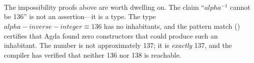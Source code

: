 \documentclass[11pt,a4paper]{book}
\def\alpha{alpha}%
\def\texttt#1{#1}%
\def\text#1{#1}%
\begin{document}
\begin{code}
\AgdaSpace{}%
\<%
\\
\>[0]\AgdaSpace{}%
\AgdaSymbol{=}\AgdaSpace{}%
\<%
\\
%
\\[\AgdaEmptyExtraSkip]%
\>[0]\AgdaSpace{}%
\AgdaSymbol{:}\AgdaSpace{}%
\AgdaSpace{}%
\AgdaSpace{}%
\<%
\\
\>[0]\AgdaSpace{}%
\AgdaSymbol{=}\AgdaSpace{}%
\<%
\\
%
\\[\AgdaEmptyExtraSkip]%
\>[0]\AgdaSpace{}%
\AgdaSymbol{:}\AgdaSpace{}%
\AgdaSpace{}%
\AgdaSpace{}%
\<%
\\
\>[0]\AgdaSpace{}%
\AgdaSymbol{=}\AgdaSpace{}%
\<%
\\
%
\\[\AgdaEmptyExtraSkip]%
\>[0]\AgdaSpace{}%
\AgdaSymbol{:}\AgdaSpace{}%
\AgdaSpace{}%
\AgdaSymbol{(}\AgdaSpace{}%
\AgdaSpace{}%
\AgdaSymbol{)}\<%
\\
\>[0]\AgdaSpace{}%
\AgdaSymbol{()}\<%
\\
%
\\[\AgdaEmptyExtraSkip]%
\>[0]\AgdaSpace{}%
\AgdaSymbol{:}\AgdaSpace{}%
\AgdaSpace{}%
\AgdaSymbol{(}\AgdaSpace{}%
\AgdaSpace{}%
\AgdaSymbol{)}\<%
\\
\>[0]\AgdaSpace{}%
\AgdaSymbol{()}\<%
\end{code}

The impossibility proofs above are worth dwelling on. The claim ``$\alpha^{-1}$ cannot be 136'' is not an assertion---it is a type. The type $\alpha\text{-inverse-integer} \equiv 136$ has no inhabitants, and the pattern match \texttt{()} certifies that Agda found zero constructors that could produce such an inhabitant. The number is not approximately 137; it is \emph{exactly} 137, and the compiler has verified that neither 136 nor 138 is reachable.
\end{document}
